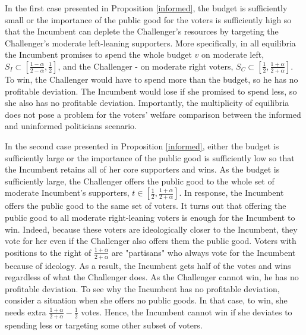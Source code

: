\documentclass[12pt,english]{article}
\begin{document}
In the first case presented in Proposition \ref{informed}, the budget is sufficiently small or the importance of the public good for the voters is sufficiently high so that the Incumbent can deplete the Challenger's resources by targeting the Challenger's moderate left-leaning supporters. More specifically, in all equilibria the Incumbent promises to spend the whole budget $v$ on moderate left, $S_I \subset [\frac{1 - \alpha}{2 - \alpha},\frac{1}{2}]$, and the Challenger - on moderate right voters, $S_C \subset [\frac{1}{2}, \frac{1 + \alpha}{2 + \alpha}]$. To win, the Challenger would have to spend more than the budget, so he has no profitable deviation.  The Incumbent would lose if she promised to spend less, so she also has no profitable deviation. Importantly, the multiplicity of equilibria does not pose a problem for the voters' welfare comparison between the informed and uninformed politicians scenario.    

In the second case presented in Proposition \ref{informed}, either the budget is sufficiently large or the importance of the public good is sufficiently low so that the Incumbent retains all of her core supporters and wins. 
As the budget is sufficiently large, the Challenger offers the public good to the whole set of moderate Incumbent's supporters, $t\in[\frac{1}{2},\frac{1 + \alpha}{2 + \alpha}]$. In response, the Incumbent offers the public good to the same set of voters. It turns out that offering the public good to all moderate right-leaning voters is enough for the Incumbent to win. Indeed, because these voters are ideologically closer to the Incumbent, they vote for her even if the Challenger also offers them the public good. Voters with positions to the right of $\frac{1 + \alpha}{2 + \alpha}$ are "partisans" who always vote for the Incumbent because of ideology. As a result, the Incumbent gets half of the votes and wins regardless of what the Challenger does.  As the Challenger cannot win, he has no profitable deviation. To see why the Incumbent has no profitable deviation, consider a situation when she offers no public goods. In that case, to win, she needs extra $\frac{1 + \alpha}{2 + \alpha} - \frac{1}{2}$ votes. Hence, the Incumbent cannot win if she deviates to spending less or targeting some other subset of voters. 
\end{document}
